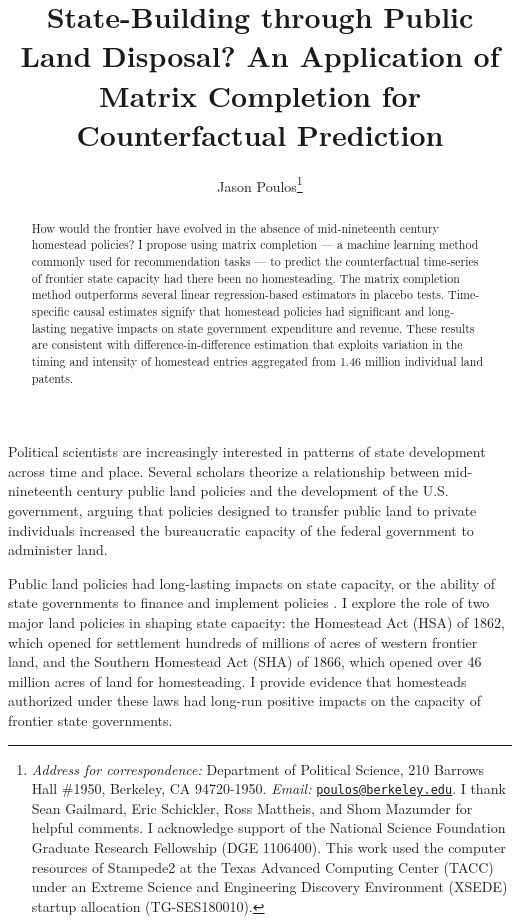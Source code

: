 \documentclass[12pt]{article}
\title{State-Building through Public Land Disposal? An Application of Matrix Completion for Counterfactual Prediction}
\author[ ]{Jason Poulos\thanks{\emph{Address for correspondence:} Department of Political Science, 210 Barrows Hall \#1950, Berkeley, CA 94720-1950. \emph{Email:} \href{mailto:poulos@berkeley.edu}{\nolinkurl{poulos@berkeley.edu}}. I thank Sean Gailmard, Eric Schickler, Ross Mattheis, and Shom Mazumder for helpful comments. I acknowledge support of the National Science Foundation Graduate Research Fellowship (DGE 1106400). This work used the computer resources of Stampede2 at the Texas Advanced Computing Center (TACC) under an Extreme Science and Engineering Discovery Environment (XSEDE) startup allocation (TG-SES180010).}}
\affil[ ]{University of California, Berkeley}
\date{}
\begin{document}
 
 
\begin{singlespacing}
\maketitle  
\end{singlespacing}

\thispagestyle{empty}

\begin{abstract}  
\noindent
How would the frontier have evolved in the absence of mid-nineteenth century homestead policies? I propose using matrix completion --- a machine learning method commonly used for recommendation tasks --- to predict the counterfactual time-series of frontier state capacity had there been no homesteading. The matrix completion method outperforms several linear regression-based estimators in placebo tests. Time-specific causal estimates signify that homestead policies had significant and long-lasting negative impacts on state government expenditure and revenue. These results are consistent with difference-in-difference estimation that exploits variation in the timing and intensity of homestead entries aggregated from 1.46 million individual land patents.\\
\end{abstract}	

\pagebreak
{}%

Political scientists are increasingly interested in patterns of state development across time and place. Several scholars \citep[e.g.,][]{bensel1990,murtazashvili2013political,frymer2014rush} theorize a relationship between mid-nineteenth century public land policies and the development of the U.S. government, arguing that policies designed to transfer public land to private individuals increased the bureaucratic capacity of the federal government to administer land. 

Public land policies had long-lasting impacts on state capacity, or the ability of state governments to finance and implement policies \citep{besley2010state}. I explore the role of two major land policies in shaping state capacity: the Homestead Act (HSA) of 1862, which opened for settlement hundreds of millions of acres of western frontier land, and the Southern Homestead Act (SHA) of 1866, which opened over 46 million acres of land for homesteading. I provide evidence that homesteads authorized under these laws had long-run positive impacts on the capacity of frontier state governments. 
\end{document}
